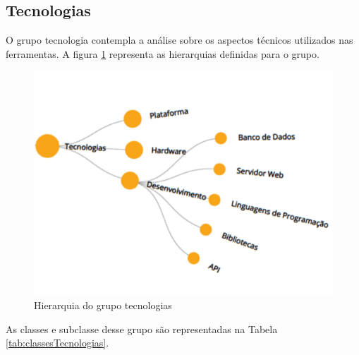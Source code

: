 \subsection{Tecnologias}
\label{subsubsec:tecnologias}
O grupo tecnologia contempla a análise sobre os aspectos técnicos utilizados nas ferramentas.
A figura \ref{fig:grupo-tecnologias} representa as hierarquias definidas para o grupo.

\begin{figure}[!ht]
    \centering
    \includegraphics[scale=0.20]{./figuras/tecnologias.png}
    \caption{Hierarquia do grupo tecnologias}
    \label{fig:grupo-tecnologias}
\end{figure}

\par
As classes e subclasse desse grupo são representadas  na Tabela \ref{tab:classesTecnologias}.


